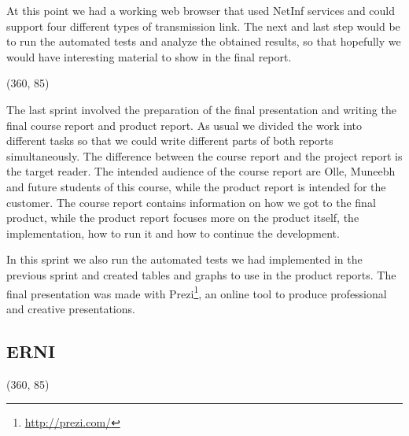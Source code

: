 At this point we had a working web browser that used NetInf services and could support four different types of transmission link.
The next and last step would be to run the automated tests and analyze the obtained results, so that hopefully we would have interesting material
to show in the final report.

\framebox(360, 85){
}

The last sprint involved the preparation of the final presentation and writing the final course report and
product report. As usual we divided the work into different tasks so that we could write different parts
of both reports simultaneously. The difference between the course report
and the project report is the target reader. The intended audience of the course report are Olle, Muneebh and future students
of this course, while the product report is intended for the customer. The course report contains information
on how we got to the final product, while the product report focuses more on the product itself, the implementation,
how to run it and how to continue the development.

In this sprint we also run the automated tests we had implemented in the previous sprint and created tables
and graphs to use in the product reports. The final presentation was made with Prezi\footnote{\url{http://prezi.com/}}, an online tool
to produce professional and creative presentations.

\subsection {ERNI}

\framebox(360, 85){
}

